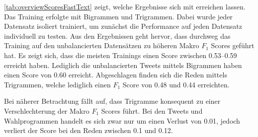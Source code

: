 \autoref{tab:overviewScoresFastText} zeigt, welche Ergebnisse sich mit \ft erreichen lassen. Das Training erfolgte mit Bigrammen und Trigrammen. Dabei wurde jeder Datensatz isoliert trainiert, um zunächst die Performance auf jeden Datensatz individuell zu testen. Aus den Ergebnissen geht hervor, dass durchweg das Training auf den unbalancierten Datensätzen zu höheren Makro \(F_1\) Scores geführt hat. Es zeigt sich, dass die meisten Trainings einen Score zwischen \numrange{0.53}{0.59} erreicht haben. Lediglich die unbalancierten Tweets mittels Bigrammen haben einen Score von \num{0.60} erreicht. Abgeschlagen finden sich die Reden mittels Trigrammen, welche lediglich einen \(F_1\) Score von \num{0.48} und \num{0.44} erreichten.

Bei näherer Betrachtung fällt auf, dass Trigramme konsequent zu einer Verschlechterung der Makro \(F_1\) Scores führt. Bei den Tweets und Wahlprogrammen handelt es sich zwar nur um einen Verlust von \num{0.01}, jedoch verliert der Score bei den Reden zwischen \num{0.1} und \num{0.12}.


